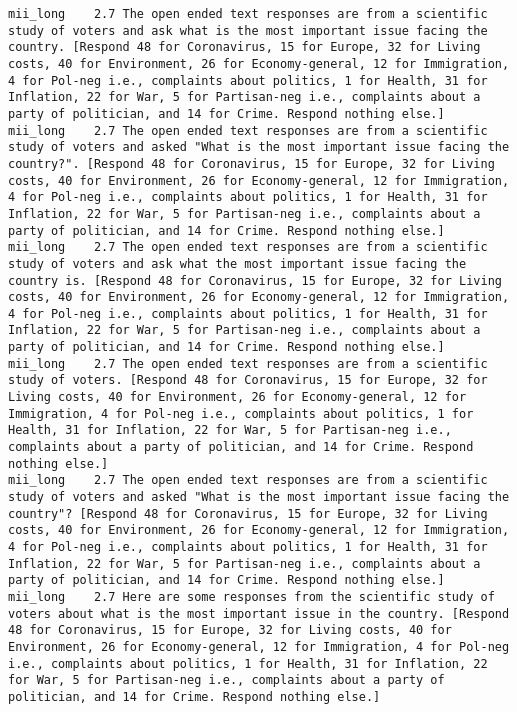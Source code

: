 \begin{lstlisting}[label=lst:promptvariants]
mii_long	2.7	The open ended text responses are from a scientific study of voters and ask what is the most important issue facing the country. [Respond 48 for Coronavirus, 15 for Europe, 32 for Living costs, 40 for Environment, 26 for Economy-general, 12 for Immigration, 4 for Pol-neg i.e., complaints about politics, 1 for Health, 31 for Inflation, 22 for War, 5 for Partisan-neg i.e., complaints about a party of politician, and 14 for Crime. Respond nothing else.]
mii_long	2.7	The open ended text responses are from a scientific study of voters and asked "What is the most important issue facing the country?". [Respond 48 for Coronavirus, 15 for Europe, 32 for Living costs, 40 for Environment, 26 for Economy-general, 12 for Immigration, 4 for Pol-neg i.e., complaints about politics, 1 for Health, 31 for Inflation, 22 for War, 5 for Partisan-neg i.e., complaints about a party of politician, and 14 for Crime. Respond nothing else.]
mii_long	2.7	The open ended text responses are from a scientific study of voters and ask what the most important issue facing the country is. [Respond 48 for Coronavirus, 15 for Europe, 32 for Living costs, 40 for Environment, 26 for Economy-general, 12 for Immigration, 4 for Pol-neg i.e., complaints about politics, 1 for Health, 31 for Inflation, 22 for War, 5 for Partisan-neg i.e., complaints about a party of politician, and 14 for Crime. Respond nothing else.]
mii_long	2.7	The open ended text responses are from a scientific study of voters. [Respond 48 for Coronavirus, 15 for Europe, 32 for Living costs, 40 for Environment, 26 for Economy-general, 12 for Immigration, 4 for Pol-neg i.e., complaints about politics, 1 for Health, 31 for Inflation, 22 for War, 5 for Partisan-neg i.e., complaints about a party of politician, and 14 for Crime. Respond nothing else.]
mii_long	2.7	The open ended text responses are from a scientific study of voters and asked "What is the most important issue facing the country"? [Respond 48 for Coronavirus, 15 for Europe, 32 for Living costs, 40 for Environment, 26 for Economy-general, 12 for Immigration, 4 for Pol-neg i.e., complaints about politics, 1 for Health, 31 for Inflation, 22 for War, 5 for Partisan-neg i.e., complaints about a party of politician, and 14 for Crime. Respond nothing else.]
mii_long	2.7	Here are some responses from the scientific study of voters about what is the most important issue in the country. [Respond 48 for Coronavirus, 15 for Europe, 32 for Living costs, 40 for Environment, 26 for Economy-general, 12 for Immigration, 4 for Pol-neg i.e., complaints about politics, 1 for Health, 31 for Inflation, 22 for War, 5 for Partisan-neg i.e., complaints about a party of politician, and 14 for Crime. Respond nothing else.]

\end{lstlisting}
